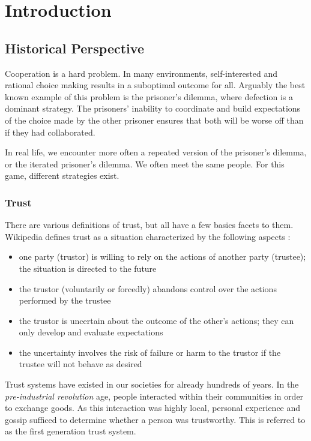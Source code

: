 \chapter{Introduction}
\section{Historical Perspective}
Cooperation is a hard problem. In many environments, self-interested and rational choice making results in a suboptimal outcome for all. Arguably the best known example of this problem is the prisoner's dilemma, where defection is a dominant strategy. The prisoners' inability to coordinate and build expectations of the choice made by the other prisoner ensures that both will be worse off than if they had collaborated.

In real life, we encounter more often a repeated version of the prisoner's dilemma, or the iterated prisoner's dilemma. We often meet the same people. For this game, different strategies exist. 

\subsection{Trust}
There are various definitions of trust, but all have a few basics facets to them. Wikipedia defines trust as a situation characterized by the following aspects \cite{wikipedia_trust}:
\begin{itemize}
	\item one party (trustor) is willing to rely on the actions of another party (trustee); the situation is directed to the future
	\item the trustor (voluntarily or forcedly) abandons control over the actions performed by the trustee
	\item the trustor is uncertain about the outcome of the other's actions; they can only develop and evaluate expectations
	\item the uncertainty involves the risk of failure or harm to the trustor if the trustee will not behave as desired
\end{itemize}
Trust systems have existed in our societies for already hundreds of years. In the \emph{pre-industrial revolution} age, people interacted within their communities in order to exchange goods. As this interaction was highly local, personal experience and gossip sufficed to determine whether a person was trustworthy. This is referred to as the first generation trust system. 


